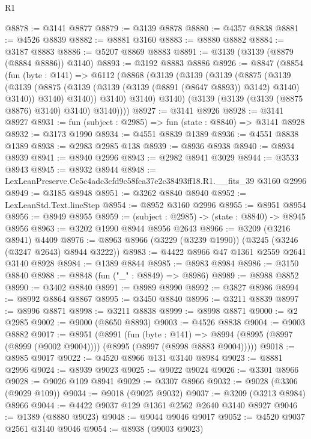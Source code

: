 \begin{lexlean}{R1}
\begin{coremodule}
@8878 := @3141 @8877
@8879 := @3139 @8878
@8880 := @4357 @8838
@8881 := @4526 @8839
@8882 := @8881 @3160
@8883 := @8880 @8882
@8884 := @3187 @8883
@8886 := @5207 @8869 @8883
@8891 := @3139 (@3139 (@8879 (@8884 @8886)) @3140)
@8893 := @3192 @8883 @8886
@8926 := @8847
    (@8854
      (fun (byte : @141) =>
      @6112
        (@8868
          (@3139
            (@3139
              (@3139
                (@8875
                  (@3139
                    (@3139
                      (@8875 (@3139 (@3139 (@3139 (@8891 (@8647 @8893)) @3142) @3140) @3140))
                      @3140)
                    @3140))
                @3140)
              @3140)
            @3140)
          (@3139 (@3139 (@3139 (@8875 @8876) @3140) @3140) @3140))))
@8927 := @3141 @8926
@8928 := @3141 @8927
@8931 := fun (subject : @2985) => fun (state : @8840) => @3141 @8928
@8932 := @3173 @1990
@8934 := @4551 @8839 @1389
@8936 := @4551 @8838 @1389
@8938 := @2983 @2985 @138
@8939 := @8936 @8938
@8940 := @8934 @8939
@8941 := @8940 @2996
@8943 := @2982 @8941 @3029
@8944 := @3533 @8943
@8945 := @8932 @8944
@8948 := LexLeanPreserve.Ce5c4adc3cfd9c58fca37e2c38493ff18.R1.__fits_39 @3160 @2996
@8949 := @3185 @8948
@8951 := @3262 @8840 @8940
@8952 := LexLeanStd.Text.lineStep
@8954 := @8952 @3160 @2996
@8955 := @8951 @8954
@8956 := @8949 @8955
@8959 := (subject : @2985) -> (state : @8840) -> @8945 @8956
@8963 := @3202 @1990 @8944 @8956 @2643
@8966 := @3209 (@3216 @8941) @4409
@8976 := @8963 @8966 (@3229 (@3239 @1990)) (@3245 (@3246 (@3247 @2643) @8944 @3222))
@8983 := @4422 @8966 @47 @1361 @2559 @2641 @3140 @8928
@8984 := @1389 @8844
@8985 := @8983 @8984
@8986 := @3150 @8840
@8988 := @8848 (fun ("_" : @8849) => @8986)
@8989 := @8988 @8852
@8990 := @3402 @8840
@8991 := @8989 @8990
@8992 := @3827 @8986
@8994 := @8992 @8864 @8867
@8995 := @3450 @8840
@8996 := @3211 @8839
@8997 := @8996 @8871
@8998 := @3211 @8838
@8999 := @8998 @8871
@9000 := @2 @2985
@9002 := @9000 (@8650 @8893)
@9003 := @4526 @8838
@9004 := @9003 @8882
@9017 := @8951
    (@8991
      (fun (byte : @141) =>
      @8994 (@8995 (@8997 (@8999 (@9002 @9004)))) (@8995 (@8997 (@8998 @8883 @9004)))))
@9018 := @8985 @9017
@9022 := @4520 @8966 @131 @3140 @8984
@9023 := @8881 @2996
@9024 := @8939 @9023
@9025 := @9022 @9024
@9026 := @3301 @8966
@9028 := @9026 @109 @8941
@9029 := @3307 @8966
@9032 := @9028 (@3306 (@9029 @109))
@9034 := @9018 (@9025 @9032)
@9037 := @3209 (@3213 @8984) @8966
@9044 := @4422 @9037 @129 @1361 @2562 @2640 @3140 @8927
@9046 := @1389 (@8880 @9023)
@9048 := @9044 @9046 @9017
@9052 := @4520 @9037 @2561 @3140 @9046
@9054 := @8938 (@9003 @9023)

\end{coremodule}
\end{lexlean}

